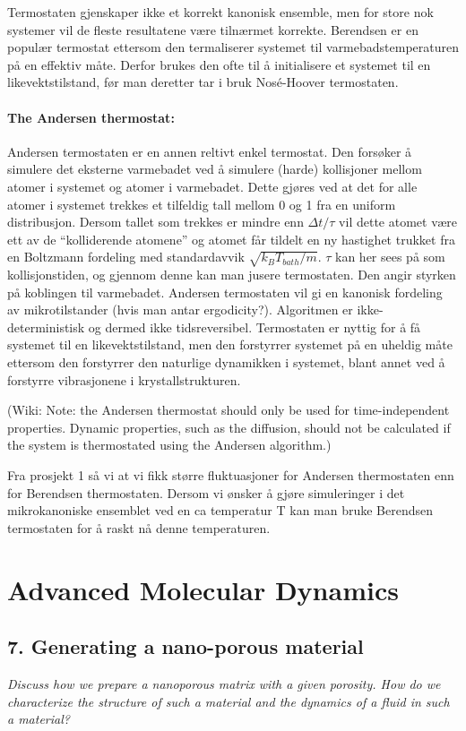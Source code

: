 \documentclass[a4paper,10pt]{article}
\begin{document}
Termostaten gjenskaper ikke et korrekt kanonisk ensemble, men for store nok systemer vil de fleste resultatene være tilnærmet korrekte. Berendsen er en populær termostat ettersom den termaliserer systemet til varmebadstemperaturen på en effektiv måte. Derfor brukes den ofte til å initialisere et systemet til en likevektstilstand, før man deretter tar i bruk Nosé-Hoover termostaten. 


\paragraph{The Andersen thermostat:}
Andersen termostaten er en annen reltivt enkel termostat. Den forsøker å simulere det eksterne varmebadet ved å simulere (harde) kollisjoner mellom atomer i systemet og atomer i varmebadet. Dette gjøres ved at det for alle atomer i systemet trekkes et tilfeldig tall mellom 0 og 1 fra en uniform distribusjon. Dersom tallet som trekkes er mindre enn $\Delta t/\tau$ vil dette atomet være ett av de ``kolliderende atomene'' og atomet får tildelt en ny hastighet trukket fra en Boltzmann fordeling med standardavvik $\sqrt{k_BT_{bath}/m}$. $\tau$ kan her sees på som kollisjonstiden, og gjennom denne kan man jusere termostaten. Den angir styrken på koblingen til varmebadet.  Andersen termostaten vil gi en kanonisk fordeling av mikrotilstander (hvis man antar ergodicity?). Algoritmen er ikke-deterministisk og dermed ikke tidsreversibel. Termostaten er nyttig for å få systemet til en likevektstilstand, men den forstyrrer systemet på en uheldig måte ettersom den forstyrrer den naturlige dynamikken i systemet, blant annet ved å forstyrre vibrasjonene i krystallstrukturen.

(Wiki: Note: the Andersen thermostat should only be used for time-independent properties. Dynamic properties, such as the diffusion, should not be calculated if the system is thermostated using the Andersen algorithm.)

Fra prosjekt 1 så vi at vi fikk større fluktuasjoner for Andersen thermostaten enn for Berendsen thermostaten. Dersom vi ønsker å gjøre simuleringer i det mikrokanoniske ensemblet ved en ca temperatur T kan man bruke Berendsen termostaten for å raskt nå denne temperaturen.


\section*{Advanced Molecular Dynamics}

\subsection*{7. Generating a nano-porous material}
\textit{Discuss how we prepare a nanoporous matrix with a given porosity. How do we
characterize the structure of such a material and the dynamics of a fluid in such
a material?}
\end{document}

